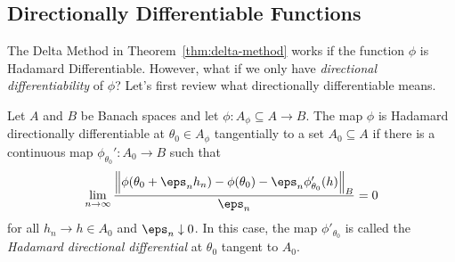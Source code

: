 \subsection{Directionally Differentiable Functions}%
\label{subsec:directionally-differentiable}

The Delta Method in Theorem~\ref{thm:delta-method} works if the function \(\phi\) is Hadamard Differentiable. However, what if we only have  \textit{directional differentiability} of \(\phi\)? Let's first review what directionally differentiable means. 
\begin{definition}
	\label{def:directional-hadamard}
	Let \(A\) and  \(B\) be Banach spaces and let  \(\phi: A_\phi \subseteq A \to B\). The map  \(\phi\) is Hadamard directionally differentiable at  \(\theta_0 \in A_{\phi}\) tangentially to a set  \(A_0 \subseteq A\) if there is a continuous map  \(\phi_{\theta_0}':A_0\to B\) such that 
	\begin{equation}
		\label{eq:directional-hadamard}
		\lim_{n\to \infty}\frac{\left\|\phi(\theta_0 + \eps_n h_n)-\phi(\theta_0) - \eps_n\phi_{\theta_0}'(h)\right\|_B}{\eps_n} = 0
	\end{equation}
	for all \(h_n \to h\in A_0\) and \(\eps_n\downarrow 0\). In this case, the map \(\phi'_{\theta_0}\) is called the \textit{Hadamard directional differential} at \(\theta_0\) tangent to \(A_0\).
\end{definition}
